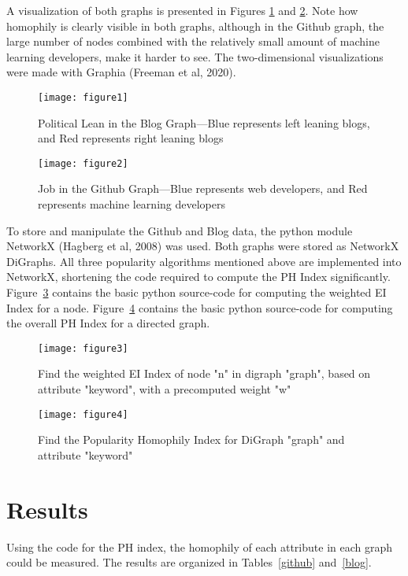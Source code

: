 \documentclass{article}
\begin{document}
A visualization of both graphs is presented in Figures \ref{pol_lean} and \ref{job}. Note how
homophily is clearly visible in both graphs, although in the Github
graph, the large number of nodes combined with the relatively small
amount of machine learning developers, make it harder to see. The
two-dimensional visualizations were made with Graphia (Freeman et al,
2020).

\begin{figure}
  \centering
\texttt{[image: figure1]}
\caption{Political Lean in the Blog Graph---Blue represents left
leaning blogs, and Red represents right leaning blogs}
\label{pol_lean}
\end{figure}


\begin{figure}
  \centering
	\texttt{[image: figure2]}
	\caption{Job in the Github Graph---Blue represents web developers, and
		Red represents machine learning developers}
	\label{job}
\end{figure}


To store and manipulate the Github and Blog data, the python module
NetworkX (Hagberg et al, 2008) was used. Both graphs were stored as
NetworkX DiGraphs. All three popularity algorithms mentioned above are
implemented into NetworkX, shortening the code required to compute the
PH Index significantly. Figure~\ref{python_weighted} contains the basic python source-code
for computing the weighted EI Index for a node. Figure~\ref{python_overall} contains the
basic python source-code for computing the overall PH Index for a
directed graph.

\begin{figure}
  \centering
	\texttt{[image: figure3]}
	\caption{Find the weighted EI Index of node "n" in digraph "graph",
		based on attribute "keyword", with a precomputed weight "w"}
	\label{python_weighted}
\end{figure}

\begin{figure}
  \centering
	\texttt{[image: figure4]}
	\caption{Find the Popularity Homophily Index for DiGraph "graph" and
		attribute "keyword"}
	\label{python_overall}
\end{figure}

\section{Results}

Using the code for the PH index, the homophily of each attribute in each
graph could be measured. The results are organized in Tables~\ref{github} and~\ref{blog}.
\end{document}
